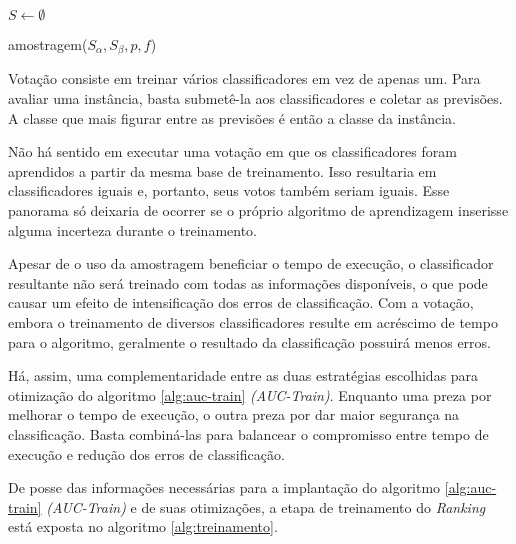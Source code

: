 \begin{function}[h!]

    $S \gets \emptyset$\;
    


    \caption{amostragem($S_{\alpha}, S_{\beta}, p, f$)}
    \label{func:amostragem}
\end{function}

Votação consiste em treinar vários classificadores em vez de apenas um. Para avaliar uma instância, basta submetê-la aos classificadores e coletar as previsões. A classe que mais figurar entre as previsões é então a classe da instância.

Não há sentido em executar uma votação em que os classificadores foram aprendidos a partir da mesma base de treinamento. Isso resultaria em classificadores iguais e, portanto, seus votos também seriam iguais. Esse panorama só deixaria de ocorrer se o próprio algoritmo de aprendizagem inserisse alguma incerteza durante o treinamento.

Apesar de o uso da amostragem beneficiar o tempo de execução, o classificador resultante não será treinado com todas as informações disponíveis, o que pode causar um efeito de intensificação dos erros de classificação. Com a votação, embora o treinamento de diversos classificadores resulte em acréscimo de tempo para o algoritmo, geralmente o resultado da classificação possuirá menos erros.

Há, assim, uma complementaridade entre as duas estratégias escolhidas para otimização do algoritmo \ref{alg:auc-train} \emph{(AUC-Train)}. Enquanto uma preza por melhorar o tempo de execução, o outra preza por dar maior segurança na classificação. Basta combiná-las para balancear o compromisso entre tempo de execução e redução dos erros de classificação.

De posse das informações necessárias para a implantação do algoritmo \ref{alg:auc-train} \emph{(AUC-Train)} e de suas otimizações, a etapa de treinamento do \emph{Ranking} está exposta no algoritmo \ref{alg:treinamento}.

